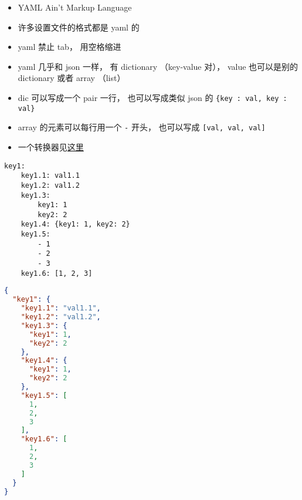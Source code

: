 
\begin{issues}
\issueDraft
\end{issues}

\begin{itemize}
\item YAML Ain't Markup Language
\item 许多设置文件的格式都是 yaml 的
\item yaml 禁止 tab， 用空格缩进
\item yaml 几乎和 json 一样， 有 dictionary （key-value 对）， value 也可以是别的 dictionary 或者 array （list）
\item dic 可以写成一个 pair 一行， 也可以写成类似 json 的 \verb|{key : val, key : val}|
\item array 的元素可以每行用一个 \verb|-| 开头， 也可以写成 \verb|[val, val, val]|
\item 一个转换器见\href{https://onlineyamltools.com/convert-yaml-to-json}{这里}
\end{itemize}

\begin{lstlisting}[language=none]
key1:
    key1.1: val1.1
    key1.2: val1.2
    key1.3:
        key1: 1
        key2: 2
    key1.4: {key1: 1, key2: 2}
    key1.5:
        - 1
        - 2
        - 3
    key1.6: [1, 2, 3]
\end{lstlisting}

\begin{lstlisting}[language=json]
{
  "key1": {
    "key1.1": "val1.1",
    "key1.2": "val1.2",
    "key1.3": {
      "key1": 1,
      "key2": 2
    },
    "key1.4": {
      "key1": 1,
      "key2": 2
    },
    "key1.5": [
      1,
      2,
      3
    ],
    "key1.6": [
      1,
      2,
      3
    ]
  }
}
\end{lstlisting}